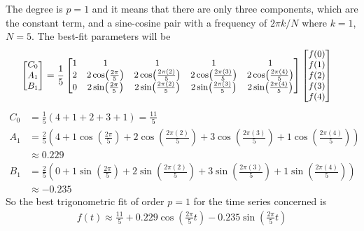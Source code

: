\begin{solution}
The degree is $p=1$ and it means that there are only three components, which are the constant term, and a sine-cosine pair with a frequency of $2\pi k/N$ where $k=1$, $N=5$. The best-fit parameters will be
\begin{align*}
\small
\begin{bmatrix}
C_0 \\
A_1 \\
B_1
\end{bmatrix}
&= 
\frac{1}{5}
\small
\begin{bmatrix}
1 & 1 & 1 & 1 & 1 \\
2 & 2\cos(\frac{2\pi}{5}) & 2\cos(\frac{2\pi(2)}{5}) & 2\cos(\frac{2\pi(3)}{5}) & 2\cos(\frac{2\pi(4)}{5}) \\
0 & 2\sin(\frac{2\pi}{5}) & 2\sin(\frac{2\pi(2)}{5}) & 2\sin(\frac{2\pi(3)}{5}) & 2\sin(\frac{2\pi(4)}{5})
\end{bmatrix}
\small
\begin{bmatrix}
f(0)\\
f(1)\\
f(2)\\
f(3)\\
f(4)
\end{bmatrix} 
\end{align*}
\begin{align*}
C_0 &= \frac{1}{5} (4+1+2+3+1) = \frac{11}{5} \\
A_1 &= \frac{2}{5} \left(4 + 1\cos(\frac{2\pi}{5}) + 2\cos(\frac{2\pi(2)}{5}) + 3\cos(\frac{2\pi(3)}{5}) + 1\cos(\frac{2\pi(4)}{5})\right) \\
&\approx 0.229 \\
B_1 &= \frac{2}{5} \left(0 + 1\sin(\frac{2\pi}{5}) + 2\sin(\frac{2\pi(2)}{5}) + 3\sin(\frac{2\pi(3)}{5}) + 1\sin(\frac{2\pi(4)}{5})\right) \\
&\approx -0.235
\end{align*}
So the best trigonometric fit of order $p=1$ for the time series concerned is
\begin{align*}
f(t) \approx \frac{11}{5} + 0.229 \cos(\frac{2\pi}{5}t) - 0.235 \sin(\frac{2\pi}{5}t)
\end{align*}
\end{solution}
